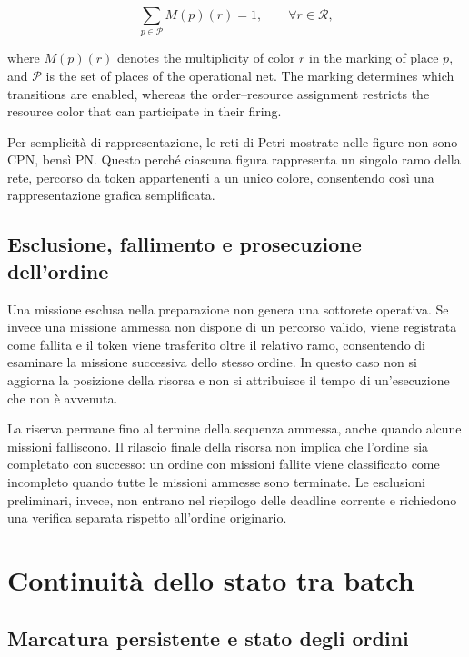 \begin{equation}
	\sum_{p\in\mathcal P} M(p)(r) = 1,
	\qquad \forall r\in\mathcal R,
\end{equation}

\noindent where $M(p)(r)$ denotes the multiplicity of color $r$ in the marking of place
$p$, and $\mathcal P$ is the set of places of the operational net.
The marking determines which transitions are enabled, whereas the
order--resource assignment restricts the resource color that can participate
in their firing.

\begin{nota}
	Per semplicità di rappresentazione, le reti di Petri mostrate nelle figure non sono CPN, bensì PN. Questo perché ciascuna figura rappresenta un singolo ramo della rete, percorso da token appartenenti a un unico colore, consentendo così una rappresentazione grafica semplificata.
\end{nota}

\subsection{Esclusione, fallimento e prosecuzione dell'ordine}

Una missione esclusa nella preparazione non genera una sottorete operativa.
Se invece una missione ammessa non dispone di un percorso valido, viene
registrata come fallita e il token viene trasferito oltre il relativo ramo,
consentendo di esaminare la missione successiva dello stesso ordine.
In questo caso non si aggiorna la posizione della risorsa e non si attribuisce
il tempo di un'esecuzione che non è avvenuta.

La riserva permane fino al termine della sequenza ammessa, anche quando
alcune missioni falliscono. Il rilascio finale della risorsa non implica
che l'ordine sia completato con successo: un ordine con missioni fallite
viene classificato come incompleto quando tutte le missioni ammesse sono
terminate. Le esclusioni preliminari, invece, non entrano nel riepilogo
delle deadline corrente e richiedono una verifica separata rispetto
all'ordine originario.

\section{Continuità dello stato tra batch}
\label{sec:progetto-tempo}

\subsection{Marcatura persistente e stato degli ordini}

